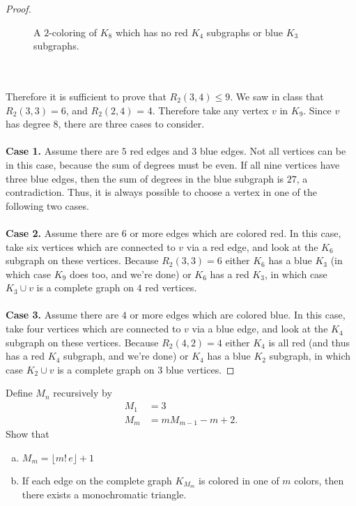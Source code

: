 \documentclass{article}
\newenvironment{problem}[2][Problem]{\begin{trivlist}
\item[\hskip \labelsep {\bfseries #1}\hskip \labelsep {\bfseries #2.}]}{\end{trivlist}}
\begin{document}
\begin{proof}
\begin{figure}[h]
    \caption{A $2$-coloring of $K_8$ which has no red $K_4$ subgraphs or blue
    $K_3$ subgraphs.}
  \end{figure}
  \\~\\
  Therefore it is sufficient to prove that $R_2(3,4) \leq 9$. We saw in class
  that $R_2(3,3) = 6$, and $R_2(2,4)$ = 4.
  Therefore take any vertex $v$ in $K_9$. Since $v$ has degree $8$, there are
  three cases to consider.
  \\~\\
  \textbf{Case 1.} Assume there are $5$ red edges and $3$ blue edges.
  Not all vertices can be in this case, because the sum of degrees
  must be even. If all nine vertices have three blue edges, then the sum of
  degrees in the blue subgraph is $27$, a contradiction. Thus,
  it is always possible to choose a vertex in one of the following two cases.
  \\~\\
  \textbf{Case 2.} Assume there are $6$ or more edges which are colored red.
  In this case, take six vertices which are connected to $v$ via a
  red edge, and look at the $K_6$ subgraph on these vertices. Because
  $R_2(3,3) = 6$ either $K_6$ has a blue $K_3$ (in which case $K_9$ does too,
  and we're done) or $K_6$ has a red $K_3$, in which case $K_3 \cup {v}$ is a
  complete graph on $4$ red vertices.
  \\~\\
  \textbf{Case 3.} Assume there are $4$ or more edges which are colored blue.
  In this case, take four vertices which are connected to $v$ via a
  blue edge, and look at the $K_4$ subgraph on these vertices. Because
  $R_2(4,2) = 4$ either $K_4$ is all red (and thus has a red $K_4$ subgraph,
  and we're done) or $K_4$ has a blue $K_2$ subgraph, in which case $K_2 \cup {v}$ is a
  complete graph on $3$ blue vertices.
\end{proof}
\pagebreak
\begin{problem}{2}
  Define $M_n$ recursively by \begin{align*}
    M_1 &= 3 \\
    M_m &= mM_{m-1} - m + 2.
  \end{align*} Show that \begin{enumerate}[(a)]
    \item $M_m = \lfloor m!\,e \rfloor + 1$
    \item If each edge on the complete graph $K_{M_m}$ is colored in one of $m$
    colors, then there exists a monochromatic triangle.
  \end{enumerate}
\end{problem}
\end{document}
